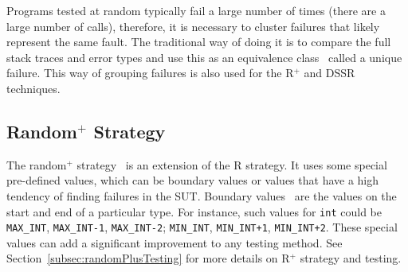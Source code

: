 Programs tested at random typically fail a large number of times (there are a large number of calls), therefore, it is necessary to cluster failures that likely represent the same fault. The traditional way of doing it is to compare the full stack traces and error types and use this as an equivalence class~\cite{ciupa2007experimental, oriol2012random} called a unique failure. This way of grouping failures is also used for the R$^+$ and DSSR techniques. 

\subsection{Random$^+$ Strategy}
The random$^+$ strategy~\cite{ciupa2007experimental, ciupa2008finding} is an extension of the R strategy. It uses some special pre-defined values, which can be boundary values or values that have a high tendency of finding failures in the SUT. Boundary values~\cite{beizer2003software} are the values on the start and end of a particular type. For instance, such values for \verb+int+ could be \verb+MAX_INT+, \verb+MAX_INT-1+, \verb+MAX_INT-2+; \verb+MIN_INT+, \verb-MIN_INT+1-, \verb-MIN_INT+2-. These special values can add a significant improvement to any testing method. See Section~\ref{subsec:randomPlusTesting} for more details on R$^+$ strategy and testing.





